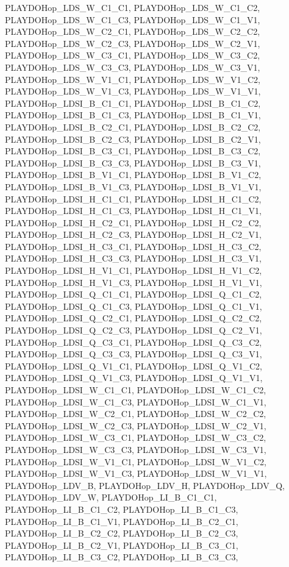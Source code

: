 PLAYDOHop\_\-LDS\_\-W\_\-C1\_\-C1, PLAYDOHop\_\-LDS\_\-W\_\-C1\_\-C2, PLAYDOHop\_\-LDS\_\-W\_\-C1\_\-C3, PLAYDOHop\_\-LDS\_\-W\_\-C1\_\-V1, PLAYDOHop\_\-LDS\_\-W\_\-C2\_\-C1, PLAYDOHop\_\-LDS\_\-W\_\-C2\_\-C2, PLAYDOHop\_\-LDS\_\-W\_\-C2\_\-C3, PLAYDOHop\_\-LDS\_\-W\_\-C2\_\-V1, PLAYDOHop\_\-LDS\_\-W\_\-C3\_\-C1, PLAYDOHop\_\-LDS\_\-W\_\-C3\_\-C2, PLAYDOHop\_\-LDS\_\-W\_\-C3\_\-C3, PLAYDOHop\_\-LDS\_\-W\_\-C3\_\-V1, PLAYDOHop\_\-LDS\_\-W\_\-V1\_\-C1, PLAYDOHop\_\-LDS\_\-W\_\-V1\_\-C2, PLAYDOHop\_\-LDS\_\-W\_\-V1\_\-C3, PLAYDOHop\_\-LDS\_\-W\_\-V1\_\-V1, PLAYDOHop\_\-LDSI\_\-B\_\-C1\_\-C1, PLAYDOHop\_\-LDSI\_\-B\_\-C1\_\-C2, PLAYDOHop\_\-LDSI\_\-B\_\-C1\_\-C3, PLAYDOHop\_\-LDSI\_\-B\_\-C1\_\-V1, PLAYDOHop\_\-LDSI\_\-B\_\-C2\_\-C1, PLAYDOHop\_\-LDSI\_\-B\_\-C2\_\-C2, PLAYDOHop\_\-LDSI\_\-B\_\-C2\_\-C3, PLAYDOHop\_\-LDSI\_\-B\_\-C2\_\-V1, PLAYDOHop\_\-LDSI\_\-B\_\-C3\_\-C1, PLAYDOHop\_\-LDSI\_\-B\_\-C3\_\-C2, PLAYDOHop\_\-LDSI\_\-B\_\-C3\_\-C3, PLAYDOHop\_\-LDSI\_\-B\_\-C3\_\-V1, PLAYDOHop\_\-LDSI\_\-B\_\-V1\_\-C1, PLAYDOHop\_\-LDSI\_\-B\_\-V1\_\-C2, PLAYDOHop\_\-LDSI\_\-B\_\-V1\_\-C3, PLAYDOHop\_\-LDSI\_\-B\_\-V1\_\-V1, PLAYDOHop\_\-LDSI\_\-H\_\-C1\_\-C1, PLAYDOHop\_\-LDSI\_\-H\_\-C1\_\-C2, PLAYDOHop\_\-LDSI\_\-H\_\-C1\_\-C3, PLAYDOHop\_\-LDSI\_\-H\_\-C1\_\-V1, PLAYDOHop\_\-LDSI\_\-H\_\-C2\_\-C1, PLAYDOHop\_\-LDSI\_\-H\_\-C2\_\-C2, PLAYDOHop\_\-LDSI\_\-H\_\-C2\_\-C3, PLAYDOHop\_\-LDSI\_\-H\_\-C2\_\-V1, PLAYDOHop\_\-LDSI\_\-H\_\-C3\_\-C1, PLAYDOHop\_\-LDSI\_\-H\_\-C3\_\-C2, PLAYDOHop\_\-LDSI\_\-H\_\-C3\_\-C3, PLAYDOHop\_\-LDSI\_\-H\_\-C3\_\-V1, PLAYDOHop\_\-LDSI\_\-H\_\-V1\_\-C1, PLAYDOHop\_\-LDSI\_\-H\_\-V1\_\-C2, PLAYDOHop\_\-LDSI\_\-H\_\-V1\_\-C3, PLAYDOHop\_\-LDSI\_\-H\_\-V1\_\-V1, PLAYDOHop\_\-LDSI\_\-Q\_\-C1\_\-C1, PLAYDOHop\_\-LDSI\_\-Q\_\-C1\_\-C2, PLAYDOHop\_\-LDSI\_\-Q\_\-C1\_\-C3, PLAYDOHop\_\-LDSI\_\-Q\_\-C1\_\-V1, PLAYDOHop\_\-LDSI\_\-Q\_\-C2\_\-C1, PLAYDOHop\_\-LDSI\_\-Q\_\-C2\_\-C2, PLAYDOHop\_\-LDSI\_\-Q\_\-C2\_\-C3, PLAYDOHop\_\-LDSI\_\-Q\_\-C2\_\-V1, PLAYDOHop\_\-LDSI\_\-Q\_\-C3\_\-C1, PLAYDOHop\_\-LDSI\_\-Q\_\-C3\_\-C2, PLAYDOHop\_\-LDSI\_\-Q\_\-C3\_\-C3, PLAYDOHop\_\-LDSI\_\-Q\_\-C3\_\-V1, PLAYDOHop\_\-LDSI\_\-Q\_\-V1\_\-C1, PLAYDOHop\_\-LDSI\_\-Q\_\-V1\_\-C2, PLAYDOHop\_\-LDSI\_\-Q\_\-V1\_\-C3, PLAYDOHop\_\-LDSI\_\-Q\_\-V1\_\-V1, PLAYDOHop\_\-LDSI\_\-W\_\-C1\_\-C1, PLAYDOHop\_\-LDSI\_\-W\_\-C1\_\-C2, PLAYDOHop\_\-LDSI\_\-W\_\-C1\_\-C3, PLAYDOHop\_\-LDSI\_\-W\_\-C1\_\-V1, PLAYDOHop\_\-LDSI\_\-W\_\-C2\_\-C1, PLAYDOHop\_\-LDSI\_\-W\_\-C2\_\-C2, PLAYDOHop\_\-LDSI\_\-W\_\-C2\_\-C3, PLAYDOHop\_\-LDSI\_\-W\_\-C2\_\-V1, PLAYDOHop\_\-LDSI\_\-W\_\-C3\_\-C1, PLAYDOHop\_\-LDSI\_\-W\_\-C3\_\-C2, PLAYDOHop\_\-LDSI\_\-W\_\-C3\_\-C3, PLAYDOHop\_\-LDSI\_\-W\_\-C3\_\-V1, PLAYDOHop\_\-LDSI\_\-W\_\-V1\_\-C1, PLAYDOHop\_\-LDSI\_\-W\_\-V1\_\-C2, PLAYDOHop\_\-LDSI\_\-W\_\-V1\_\-C3, PLAYDOHop\_\-LDSI\_\-W\_\-V1\_\-V1, PLAYDOHop\_\-LDV\_\-B, PLAYDOHop\_\-LDV\_\-H, PLAYDOHop\_\-LDV\_\-Q, PLAYDOHop\_\-LDV\_\-W, PLAYDOHop\_\-LI\_\-B\_\-C1\_\-C1, PLAYDOHop\_\-LI\_\-B\_\-C1\_\-C2, PLAYDOHop\_\-LI\_\-B\_\-C1\_\-C3, PLAYDOHop\_\-LI\_\-B\_\-C1\_\-V1, PLAYDOHop\_\-LI\_\-B\_\-C2\_\-C1, PLAYDOHop\_\-LI\_\-B\_\-C2\_\-C2, PLAYDOHop\_\-LI\_\-B\_\-C2\_\-C3, PLAYDOHop\_\-LI\_\-B\_\-C2\_\-V1, PLAYDOHop\_\-LI\_\-B\_\-C3\_\-C1, PLAYDOHop\_\-LI\_\-B\_\-C3\_\-C2, PLAYDOHop\_\-LI\_\-B\_\-C3\_\-C3, 